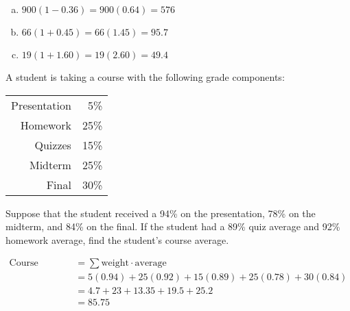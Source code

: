 \documentclass[12pt,letterpaper]{exam}
\begin{document}
\begin{questions}
\sol
\begin{enumerate}[(a)]
\item $900(1 - 0.36)= 900(0.64)= 576$ \pspace

\item $66(1 + 0.45)= 66(1.45)= 95.7$ \pspace

\item $19(1 + 1.60)= 19(2.60)= 49.4$
\end{enumerate}



\newpage
\question[10] A student is taking a course with the following grade components:
	\begin{table}[!ht]
	\centering
	\begin{tabular}{rr}
	Presentation & 5\% \\
	Homework & 25\% \\
	Quizzes & 15\% \\
	Midterm & 25\% \\
	Final & 30\% 
	\end{tabular}
	\end{table} \par
Suppose that the student received a 94\% on the presentation, 78\% on the midterm, and 84\% on the final. If the student had a 89\% quiz average and 92\% homework average, find the student's course average. \pspace

\sol 
	\[
	\begin{aligned}
	\text{Course Average}&= \sum \text{weight} \cdot \text{average} \\[0.3cm]
	&= 5(0.94) + 25(0.92) + 15(0.89) + 25(0.78) + 30(0.84) \\[0.3cm]
	&= 4.7 + 23 + 13.35 + 19.5 + 25.2 \\[0.3cm]
	&= 85.75
	\end{aligned}
	\]




\end{questions}
\end{document}
